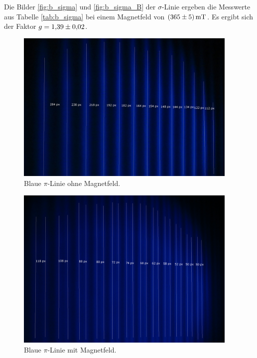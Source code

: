 Die Bilder \ref{fig:b_sigma} und \ref{fig:b_sigma_B} der $\sigma$-Linie ergeben die Messwerte aus Tabelle \ref{tab:b_sigma} bei
einem Magnetfeld von $\SI{365 \pm 5}{mT}$. Es ergibt sich der Faktor $g = \num{1.39  \pm  0.02}$.

\begin{figure}
  \centering
  \includegraphics[width=0.95\textwidth]{graphics/auswertung/IMG_1635.png}
  \caption{Blaue $\pi$-Linie ohne Magnetfeld.}
  \label{fig:b_pi}
\end{figure}
\begin{figure}
  \centering
  \includegraphics[width=0.95\textwidth]{graphics/auswertung/IMG_1644.png}
  \caption{Blaue $\pi$-Linie mit Magnetfeld.}
  \label{fig:b_pi_B}
\end{figure}

